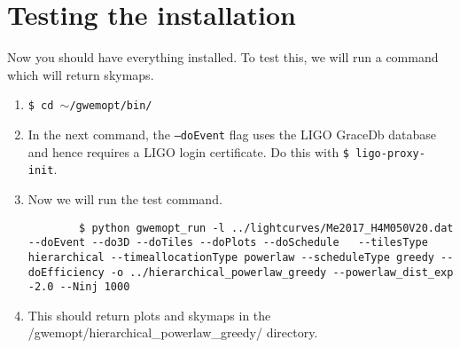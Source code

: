 \documentclass[11pt]{article}
\begin{document}
\section{Testing the installation}
Now you should have everything installed. To test this, we will run a command which will return skymaps.
\begin{enumerate}
	\item {\tt \$ cd $\sim$/gwemopt/bin/}
	\item In the next command, the {\tt --doEvent} flag uses the LIGO GraceDb database and hence requires a LIGO login certificate. Do this with {\tt \$ ligo-proxy-init}.
	\item Now we will run the test command.
	\begin{lstlisting}
		$ python gwemopt_run -l ../lightcurves/Me2017_H4M050V20.dat --doEvent --do3D --doTiles --doPlots --doSchedule 	--tilesType hierarchical --timeallocationType powerlaw --scheduleType greedy --doEfficiency -o ../hierarchical_powerlaw_greedy --powerlaw_dist_exp -2.0 --Ninj 1000	
	\end{lstlisting}
	\item This should return plots and skymaps in the /gwemopt/hierarchical\_powerlaw\_greedy/ directory.

\end{enumerate}
\end{document}
